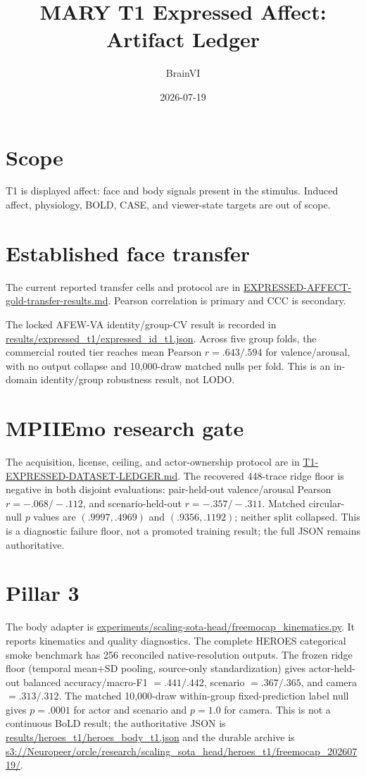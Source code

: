 \documentclass[11pt]{article}
\title{MARY T1 Expressed Affect: Artifact Ledger}
\author{BrainVI}
\date{2026-07-19}
\renewcommand{\texttt}[1]{\url{#1}}
\begin{document}
\maketitle

\section*{Scope}
T1 is displayed affect: face and body signals present in the stimulus.
Induced affect, physiology, BOLD, CASE, and viewer-state targets are out of
scope.

\section*{Established face transfer}
The current reported transfer cells and protocol are in
\texttt{EXPRESSED-AFFECT-gold-transfer-results.md}. Pearson correlation is
primary and CCC is secondary.

The locked AFEW-VA identity/group-CV result is recorded in
\texttt{results/expressed_t1/expressed_id_t1.json}. Across five group
folds, the commercial routed tier reaches mean Pearson $r=.643/.594$ for
valence/arousal, with no output collapse and 10,000-draw matched nulls per
fold. This is an in-domain identity/group robustness result, not LODO.

\section*{MPIIEmo research gate}
The acquisition, license, ceiling, and actor-ownership protocol are in
\texttt{T1-EXPRESSED-DATASET-LEDGER.md}. The recovered 448-trace ridge floor
is negative in both disjoint evaluations: pair-held-out valence/arousal
Pearson $r=-.068/-.112$, and scenario-held-out $r=-.357/-.311$.
Matched circular-null $p$ values are $(.9997,.4969)$ and $(.9356,.1192)$;
neither split collapsed. This is a diagnostic failure floor, not a promoted
training result; the full JSON remains authoritative.

\section*{Pillar 3}
The body adapter is
\texttt{experiments/scaling-sota-head/freemocap_kinematics.py}. It reports
kinematics and quality diagnostics. The complete HEROES categorical smoke
benchmark has 256 reconciled native-resolution outputs. The frozen ridge
floor (temporal mean+SD pooling, source-only standardization) gives
actor-held-out balanced accuracy/macro-F1 $=.441/.442$, scenario $=.367/.365$,
and camera $=.313/.312$. The matched 10,000-draw within-group fixed-prediction
label null gives $p=.0001$ for actor and scenario and $p=1.0$ for camera. This
is not a continuous BoLD result; the authoritative JSON is
\texttt{results/heroes_t1/heroes_body_t1.json} and the durable archive is
\texttt{s3://Neuropeer/orcle/research/scaling_sota_head/heroes_t1/freemocap_20260719/}.
\end{document}
